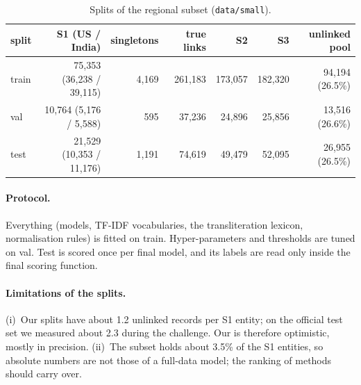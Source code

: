 \begin{table}[h]
\centering\small
\begin{tabular}{lrrrrrr}
\toprule
split & S1 (US / India) & singletons & true links & S2 & S3 & unlinked pool \\
\midrule
train & 75,353 (36,238 / 39,115) & 4,169 & 261,183 & 173,057 & 182,320 & 94,194 (26.5\%) \\
val   & 10,764 (5,176 / 5,588)    & 595   & 37,236  & 24,896  & 25,856  & 13,516 (26.6\%) \\
test  & 21,529 (10,353 / 11,176)  & 1,191 & 74,619  & 49,479  & 52,095  & 26,955 (26.5\%) \\
\bottomrule
\end{tabular}
\caption{Splits of the regional subset (\texttt{data/small}).}
\label{tab:splits}
\end{table}

\paragraph{Protocol.} Everything (models, TF-IDF vocabularies, the transliteration lexicon, normalisation
rules) is fitted on train. Hyper-parameters and thresholds are tuned on val. Test is scored once per final
model, and its labels are read only inside the final scoring function.

\paragraph{Limitations of the splits.} (i)~Our splits have about 1.2 unlinked records per S1 entity; on the
official test set we measured about 2.3 during the challenge. Our \fhalf{} is therefore optimistic, mostly in
precision. (ii)~The subset holds about 3.5\% of the S1 entities, so absolute numbers are not those of a
full-data model; the ranking of methods should carry over.
